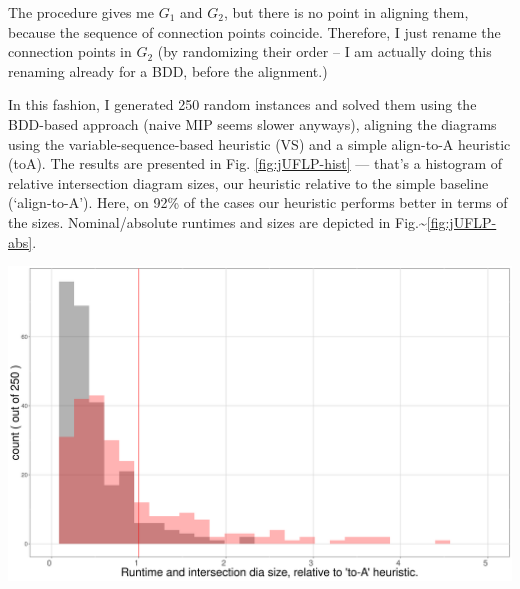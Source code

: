 \documentclass[11pt]{article}
\begin{document}
The procedure gives me \(G_1\) and \(G_2\), but there is no point in aligning them,
because the sequence of connection points coincide. Therefore, I just rename the
connection points in \(G_2\) (by randomizing their order -- I am actually doing
this renaming already for a BDD, before the alignment.)

In this fashion, I generated 250 random instances and solved them using the
BDD-based approach (naive MIP seems slower anyways), aligning the diagrams using
the variable-sequence-based heuristic (VS) and a simple align-to-A heuristic
(toA). The results are presented in Fig. \ref{fig:jUFLP-hist} --- that's a
histogram of relative intersection diagram sizes, our heuristic relative to the
simple baseline (`align-to-A'). Here, on 92\% of the cases our heuristic performs
better in terms of the sizes. Nominal/absolute runtimes and sizes are depicted
in Fig.\textasciitilde{}\ref{fig:jUFLP-abs}.

\begin{center}
\includegraphics[width=\textwidth]{./jUFLP_hist.png}
\label{fig:jUFLP-hist}
\end{center}
\end{document}

